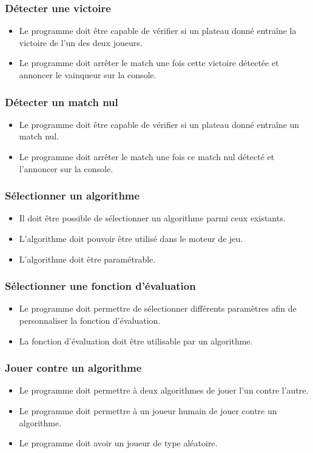 \documentclass{article}
\begin{document}
\subsubsection{Détecter une victoire}
\begin{itemize}
    \item Le programme doit être capable de vérifier si un plateau donné entraîne la victoire de l'un des deux joueurs.
    \item Le programme doit arrêter le match une fois cette victoire détectée et annoncer le vainqueur sur la console.
\end{itemize}
\medskip
\subsubsection{Détecter un match nul}
\begin{itemize}
    \item Le programme doit être capable de vérifier si un plateau donné entraîne un match nul.
    \item Le programme doit arrêter le match une fois ce match nul détecté et l'annoncer sur la console.
\end{itemize}
\medskip
\subsubsection{Sélectionner un algorithme}
\begin{itemize}
    \item Il doit être possible de sélectionner un algorithme parmi ceux existants.
    \item L'algorithme doit pouvoir être utilisé dans le moteur de jeu.
    \item L'algorithme doit être paramétrable.
\end{itemize}
\medskip
\subsubsection{Sélectionner une fonction d'évaluation}
\begin{itemize}
    \item Le programme doit permettre de sélectionner différents paramètres afin de personnaliser la fonction d'évaluation.
    \item La fonction d'évaluation doit être utilisable par un algorithme.
\end{itemize}
\medskip
\subsubsection{Jouer contre un algorithme}
\begin{itemize}
    \item Le programme doit permettre à deux algorithmes de jouer l'un contre l'autre.
    \item Le programme doit permettre à un joueur humain de jouer contre un algorithme.
    \item Le programme doit avoir un joueur de type aléatoire.
\end{itemize}
\medskip
\end{document}
